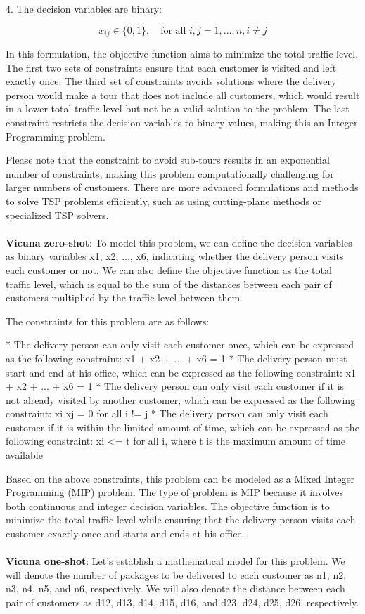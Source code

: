 \documentclass{article}%
\begin{document}
4. The decision variables are binary:

\[
x_{ij} \in \{0,1\}, \quad \text{for all } i,j=1,...,n, i\neq j
\]

In this formulation, the objective function aims to minimize the total traffic level. The first two sets of constraints ensure that each customer is visited and left exactly once. The third set of constraints avoids solutions where the delivery person would make a tour that does not include all customers, which would result in a lower total traffic level but not be a valid solution to the problem. The last constraint restricts the decision variables to binary values, making this an Integer Programming problem.

Please note that the constraint to avoid sub-tours results in an exponential number of constraints, making this problem computationally challenging for larger numbers of customers. There are more advanced formulations and methods to solve TSP problems efficiently, such as using cutting-plane methods or specialized TSP solvers.\\\\%
\textbf{Vicuna zero-shot}: To model this problem, we can define the decision variables as binary variables x1, x2, ..., x6, indicating whether the delivery person visits each customer or not. We can also define the objective function as the total traffic level, which is equal to the sum of the distances between each pair of customers multiplied by the traffic level between them.

The constraints for this problem are as follows:

* The delivery person can only visit each customer once, which can be expressed as the following constraint: x1 + x2 + ... + x6 = 1
* The delivery person must start and end at his office, which can be expressed as the following constraint: x1 + x2 + ... + x6 = 1
* The delivery person can only visit each customer if it is not already visited by another customer, which can be expressed as the following constraint: xi \* xj = 0 for all i != j
* The delivery person can only visit each customer if it is within the limited amount of time, which can be expressed as the following constraint: xi <= t for all i, where t is the maximum amount of time available

Based on the above constraints, this problem can be modeled as a Mixed Integer Programming (MIP) problem. The type of problem is MIP because it involves both continuous and integer decision variables. The objective function is to minimize the total traffic level while ensuring that the delivery person visits each customer exactly once and starts and ends at his office.\\\\%
\textbf{Vicuna one-shot}: Let's establish a mathematical model for this problem. We will denote the number of packages to be delivered to each customer as n1, n2, n3, n4, n5, and n6, respectively. We will also denote the distance between each pair of customers as d12, d13, d14, d15, d16, and d23, d24, d25, d26, respectively.
\end{document}
